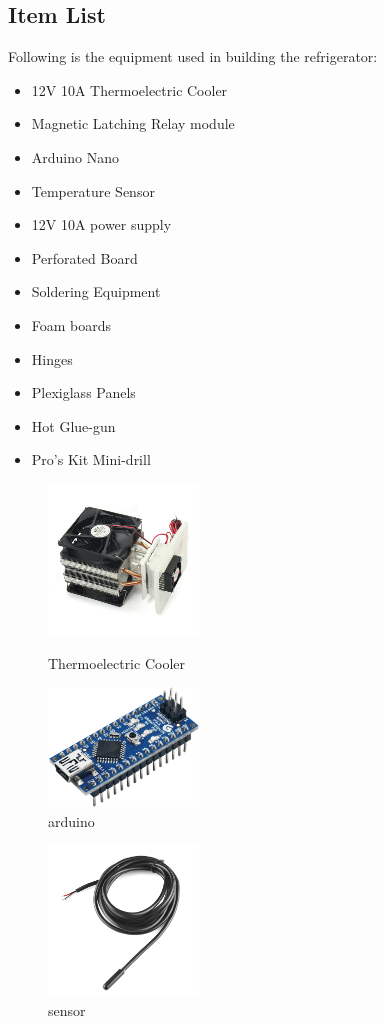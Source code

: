 \documentclass[12pt,onecolumn]{article}
\begin{document}
\subsection{Item List}
Following is the equipment used in building the refrigerator:
\begin{itemize}
	\item 12V 10A Thermoelectric Cooler
	\item Magnetic Latching Relay module
	\item Arduino Nano
	\item Temperature Sensor
	\item 12V 10A power supply
	\item Perforated Board
	\item Soldering Equipment
	\item Foam boards
	\item Hinges
	\item Plexiglass Panels
	\item Hot Glue-gun
	\item Pro's Kit Mini-drill
\end{itemize}

\begin{figure}[H]
	\begin{minipage}[t]{0.45\linewidth}
		\centering
		\includegraphics[width=4cm]{thermo_cooler}
		\caption{Thermoelectric Cooler}
	\end{minipage}%
	\hfill
	\begin{minipage}[t]{0.5\linewidth}
		\centering
		\includegraphics[width=4cm]{arduino_nano}
		\caption{arduino}
	\end{minipage}
\end{figure}

\begin{figure}[H]
	\begin{minipage}[t]{0.45\linewidth}
		\centering
		\includegraphics[width=4cm]{sensor}
		\caption{sensor}
	\end{minipage}%
	\hfill
	
\end{figure}
\end{document}
